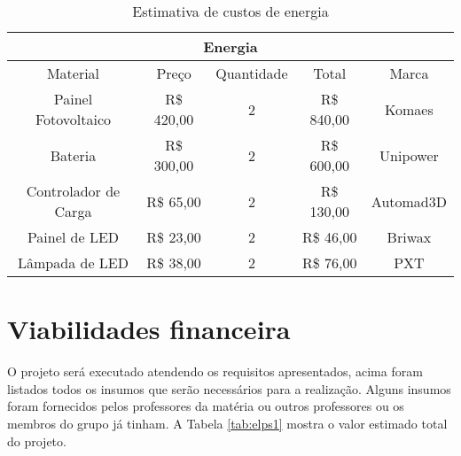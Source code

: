 \begin{table}[h]
\caption{Estimativa de custos de energia}
\label{tab:custos_energia}
\begin{tabular}{|c|c|c|c|c|}
\hline
\multicolumn{5}{|c|}{Energia}                                                 \\ \hline
Material             & Preço         & Quantidade & Total         & Marca     \\ \hline
Painel Fotovoltaico  & R\$ 420,00  & 2          & R\$ 840,00  & Komaes    \\ \hline
Bateria              & R\$ 300,00  & 2          & R\$ 600,00  & Unipower  \\ \hline
Controlador de Carga & R\$ 65,00  & 2          & R\$ 130,00  & Automad3D \\ \hline
Painel de LED        & R\$ 23,00  & 2          & R\$ 46,00 & Briwax    \\ \hline
Lâmpada de LED       & R\$ 38,00 & 2          & R\$ 76,00 & PXT         \\ \hline
\end{tabular}
\end{table}

\section{Viabilidades financeira}

O projeto será executado atendendo os requisitos apresentados, acima foram listados todos os insumos que serão necessários para a realização. Alguns insumos foram fornecidos pelos professores da matéria ou outros professores ou os membros do grupo já tinham. A Tabela \ref{tab:elps1} mostra o valor estimado total do projeto. 

